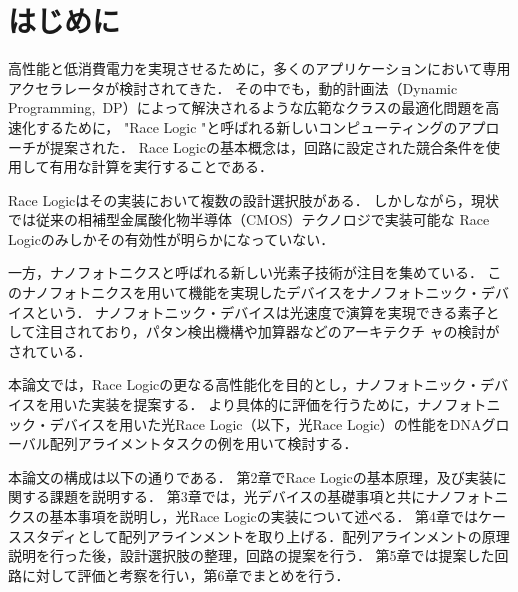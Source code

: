 \chapter{はじめに}
高性能と低消費電力を実現させるために，多くのアプリケーションにおいて専用アクセラレータが検討されてきた．
その中でも，動的計画法（Dynamic Programming, DP）によって解決されるような広範なクラスの最適化問題を高速化するために，
"Race Logic "と呼ばれる新しいコンピューティングのアプローチが提案された\cite{madhavan2014race}．
Race Logicの基本概念は，回路に設定された競合条件を使用して有用な計算を実行することである．

Race Logicはその実装において複数の設計選択肢がある．
しかしながら，現状では従来の相補型金属酸化物半導体（CMOS）テクノロジで実装可能な
Race Logicのみしかその有効性が明らかになっていない．

一方，ナノフォトニクスと呼ばれる新しい光素子技術が注目を集めている．
このナノフォトニクスを用いて機能を実現したデバイスをナノフォトニック・デバイスという．
ナノフォトニック・デバイスは光速度で演算を実現できる素子として注目されており，パタン検出機構や加算器などのアーキテクチ
ャの検討がされている．

本論文では，Race Logicの更なる高性能化を目的とし，ナノフォトニック・デバイスを用いた実装を提案する．
より具体的に評価を行うために，ナノフォトニック・デバイスを用いた光Race Logic（以下，光Race Logic）の性能をDNAグローバル配列アライメントタスクの例を用いて検討する．

本論文の構成は以下の通りである．
第2章でRace Logicの基本原理，及び実装に関する課題を説明する．
第3章では，光デバイスの基礎事項と共にナノフォトニクスの基本事項を説明し，光Race Logicの実装について述べる．
第4章ではケーススタディとして配列アラインメントを取り上げる．配列アラインメントの原理説明を行った後，設計選択肢の整理，回路の提案を行う．
第5章では提案した回路に対して評価と考察を行い，第6章でまとめを行う．


